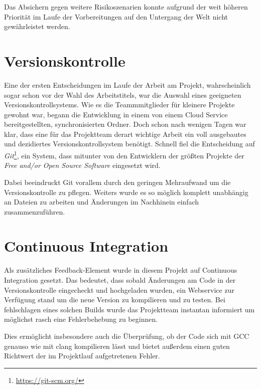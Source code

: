 Das Absichern gegen weitere Risikoszenarien konnte aufgrund der weit höheren Priorität im Laufe der Vorbereitungen auf den Untergang der Welt nicht gewährleistet werden.

\section{Versionskontrolle}
Eine der ersten Entscheidungen im Laufe der Arbeit am Projekt, wahrscheinlich sogar schon vor der Wahl des Arbeitstitels, war die Auswahl eines geeigneten Versionskontrollsystems. Wie es die Teammmitglieder für kleinere Projekte gewohnt war, begann die Entwicklung in einem von einem Cloud Service bereitgestellten, synchronisierten Ordner. Doch schon nach wenigen Tagen war klar, dass eine für das Projektteam derart wichtige Arbeit ein voll ausgebautes und dezidiertes Versionskontrollsystem benötigt. Schnell fiel die Entscheidung auf \textit{Git}\footnote{\url{https://git-scm.org/}}, ein System, dass mitunter von den Entwicklern der größten Projekte der \textit{Free and/or Open Source Software} eingesetzt wird.

Dabei beeindruckt Git vorallem durch den geringen Mehraufwand um die Versionskontrolle zu pflegen. Weiters wurde es so möglich komplett unabhängig an Dateien zu arbeiten und Änderungen im Nachhinein einfach zusammenzuführen.

\section{Continuous Integration}
Als zusätzliches Feedback-Element wurde in diesem Projekt auf Continuous Integration gesetzt. Das bedeutet, dass sobald Änderungen am Code in der Versionskontrolle eingecheckt und hochgeladen wurden, ein Webservice zur Verfügung stand um die neue Version zu kompilieren und zu testen. Bei fehlschlagen eines solchen Builds wurde das Projektteam instantan informiert um möglichst rasch eine Fehlerbehebung zu beginnen.

Dies ermöglicht insbesondere auch die Überprüfung, ob der Code sich mit GCC genauso wie mit clang kompilieren lässt und bietet außerdem einen guten Richtwert der im Projektlauf aufgetretenen Fehler. 
